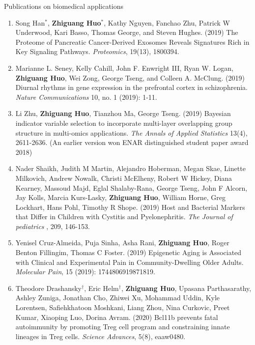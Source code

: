 \documentclass{resume} %
\begin{document}
\begin{rSection}{Publications on biomedical applications}
\begin{enumerate}[noitemsep,topsep=0pt,resume]
\item Song Han$^*$, {\bf Zhiguang Huo}$^*$,  Kathy Nguyen,  Fanchao Zhu, Patrick W Underwood, Kari Basso, Thomas George, and Steven Hughes. (2019)
The Proteome of Pancreatic Cancer-Derived Exosomes Reveals Signatures Rich in Key Signaling Pathways. \emph{Proteomics}, 19(13), 1800394.

\item Marianne L. Seney, Kelly Cahill, John F. Enwright III, Ryan W. Logan, {\bf  Zhiguang Huo}, Wei Zong, George Tseng, and Colleen A. McClung. (2019) Diurnal rhythms in gene expression in the prefrontal cortex in schizophrenia. \emph{Nature Communications} 10, no. 1 (2019): 1-11.

\item Li Zhu, {\bf  Zhiguang Huo}, Tianzhou Ma, George Tseng. (2019)
Bayesian indicator variable selection to incorporate multi-layer overlapping group structure in multi-omics applications. 
\emph{The Annals of Applied Statistics} 13(4), 2611-2636. 
(An earlier version won ENAR distinguished student paper award 2018)

\item  
Nader Shaikh, Judith M Martin, Alejandro Hoberman, Megan Skae, Linette Milkovich, Andrew Nowalk, Christi McElheny, Robert W Hickey, Diana Kearney, Massoud Majd, Eglal Shalaby-Rana, George Tseng, John F Alcorn, Jay Kolls, Marcia Kurs-Lasky, {\bf Zhiguang Huo}, William Horne, Greg Lockhart, Hans Pohl, Timothy R Shope. 
(2019)
Host and Bacterial Markers that Differ in Children with Cystitis and Pyelonephritis. \emph{The Journal of pediatrics} , 209, 146-153.

\item Yenisel Cruz-Almeida, Puja Sinha, Asha Rani, {\bf Zhiguang Huo}, Roger Benton Fillingim, Thomas C Foster. (2019)
Epigenetic Aging is Associated with Clinical and Experimental Pain in Community-Dwelling Older Adults.
\emph{Molecular Pain}, 15 (2019): 1744806919871819.

\item 
Theodore Drashansky$^\dagger$, Eric  Helm$^\dagger$, {\bf Zhiguang Huo}, Upasana Parthasarathy,  Ashley Zuniga, Jonathan Cho, Zhiwei Xu,  Mohammad Uddin,  Kyle Lorentsen, Safiehkhatoon Moshkani, Liang Zhou, Nina Curkovic, Preet Kumar,  Xiaoping Luo, Dorina Avram. (2020)
Bcl11b prevents fatal autoimmunity by promoting Treg cell program and constraining innate lineages in Treg cells. 
\emph{Science Advances}, 5(8), eaaw0480.


\end{enumerate}


\end{rSection}
\end{document}
